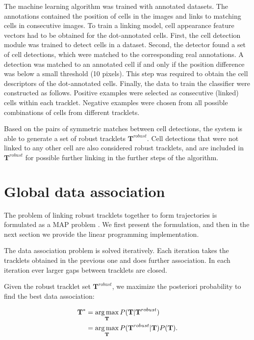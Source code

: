 		The machine learning algorithm was trained with annotated datasets. The annotations contained the position of cells in the images and links to matching cells in consecutive images. To train a linking model, cell appearance feature vectors had to be obtained for the dot-annotated cells. First, the cell detection module was trained to detect cells in a dataset. Second, the detector found a set of cell detections, which were matched to the corresponding real annotations. A detection was matched to an annotated cell if and only if the position difference was below a small threshold (10 pixels). This step was required to obtain the cell descriptors of the dot-annotated cells. Finally, the data to train the classifier were constructed as follows. Positive examples were selected as consecutive (linked) cells within each tracklet. Negative examples were chosen from all possible combinations of cells from different tracklets.

		Based on the pairs of symmetric matches between cell detections, the system is able to generate a set of robust tracklets $\textbf{T}^{robust}$. Cell detections that were not linked to any other cell are also considered robust tracklets, and are included in $\textbf{T}^{robust}$ for possible further linking in the further steps of the algorithm.
	\section{Global data association \statusfirstdraft}
		\label{sec:globaldataassoc}
		The problem of linking robust tracklets together to form trajectories is formulated as a MAP problem \cite{bise11global} \cite{zhang08} \cite{huang08}. We first present the formulation, and then in the next section we provide the linear programming implementation.
		
		The data association problem is solved iteratively. Each iteration takes the tracklets obtained in the previous one and does further association. In each iteration ever larger gaps between tracklets are closed.  
		
		Given the robust tracklet set $ \textbf{T}^{robust} $, we maximize the posteriori probability to find the best data association:
		
		\begin{align*}
			\textbf{T}^* &= \operatorname*{arg\,max}_{\textbf{T}} P(\textbf{T} | \textbf{T}^{robust}) \\
			            &= \operatorname*{arg\,max}_{\textbf{T}} P(\textbf{T}^{robust} | \textbf{T} ) P(\textbf{T}) \text{.}
		\end{align*}
				
